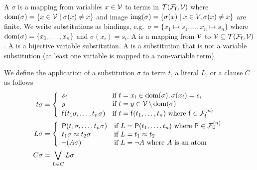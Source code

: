 


\begin{definition}\label{def:substitution}
	A  \( \sigma \) is a mapping from variables \( x\in\mathcal{V} \) to terms in \( {\mathcal{T}(\mathcal{F}_{\mathsf{f}},\mathcal{V})} \)
	where \( \operatorname{dom}(\sigma) = \{ x\in\mathcal{V}\mid\sigma(x) \neq x \} \)
	and image \( \operatorname{img}(\sigma) =\{ \sigma(x) \mid x\in V, \sigma(x)\neq x \} \) are finite.
	We write substitutions as bindings, e.g.~\( \sigma=\{ x_1\mapsto s_1,\ldots,x_n\mapsto s_n \} \)
	where \( \operatorname{dom}(\sigma)=\{ x_1,\ldots,x_n \} \) and \( \sigma(x_i)=s_i \).
	A  is a mapping from \( \mathcal{V} \) to \( \mathcal{V}\subseteq{\mathcal{T}(\mathcal{F}_{\mathsf{f}},\mathcal{V})} \).
	A  is a bijective variable substitution.
	A  is a substitution that is not a variable substitution
	(at least one variable is mapped to a non-variable term).
\end{definition}
\begin{definition}
	We define the application of a substitution \( \sigma \)
	to term $t$, a literal \( L \), or a clause \( C \) as follows
	\begin{align*}
	t\sigma &=
	\left \{
		\begin{array}{ll}
			s_i & \text{if }t=x_i\in\operatorname{dom}(\sigma), \sigma(x_i) = s_i
			\\
			y & \text{if }t=y\in\mathcal{V} \, \backslash\operatorname{dom}(\sigma)
			\\
			\mathsf{f}(t_1\sigma,\ldots,t_n\sigma)	&\text{if }t=\mathsf{f}(t_1,\ldots,t_n)
			\text{ where  }\mathsf{f}\in{\mathcal{F}^{(n)}_{\mathsf{f}}}
		\end{array}
	\right.
			 \\
	L\sigma &=
	\left \{
		\begin{array}{ll}
			\mathsf{P}(t_1\sigma,\ldots,t_n\sigma)
			&\text{if }L=\mathsf{P}(t_1,\ldots,t_n)
			\text{ where  }\mathsf{P}\in{\mathcal{F}^{(n)}_{\mathsf{P}}}
			\\
			t_1\sigma\approx t_2\sigma
			&\text{if } L = t_1\approx t_2
			\\
			\lnot(A\sigma)&\text{if } L=\lnot A\text{ where }A\text{ is an atom}
		\end{array}
	\right.
	\\
	C\sigma &= \bigvee_{L\in C} L \sigma
	\end{align*}
\end{definition}

